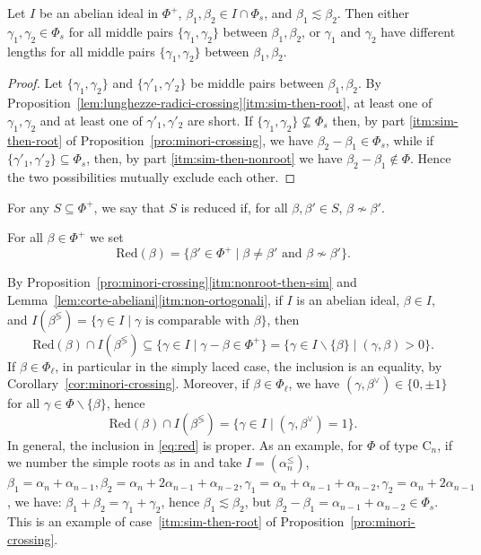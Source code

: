 \documentclass[ALCO,published]{cedram}
\theoremstyle{plain}
\newcommand\smeno{\smallsetminus}
\newcommand\al{\alpha}
\newcommand\be{\beta}
\newcommand\ga{\gamma}
\newcommand\comp{\lessgtr}
\newcommand\nosim{\not\sim}
\newcommand\red{\mathrm{Red}}
\renewcommand{\leq}{\leqslant}
\begin{document}
\begin{cor}\label{cor:minori-crossing-2}
Let $I$ be an abelian ideal in $\Phi^+$, $\be_1, \be_2\in I\cap \Phi_s$, and $\be_1\lesssim \be_2$.
Then either $\ga_1, \ga_2\in \Phi_s$ for all middle pairs  $\{\ga_1, \ga_2\}$ between $\be_1, \be_2$, 
or $\ga_1$ and $\ga_2$ have different lengths for all middle pairs  $\{\ga_1, \ga_2\}$ between $\be_1, \be_2$.
\end{cor}

\begin{proof}
Let $\{\ga_1, \ga_2\}$ and $\{\ga'_1, \ga'_2\}$ be middle pairs between $\be_1, \be_2$. 
By Proposition~\ref{lem:lunghezze-radici-crossing}\ref{itm:sim-then-root}, at least one of $\ga_1, \ga_2$ and at least one of $\ga'_1, \ga'_2$ are short.
If $\{\ga_1, \ga_2\}\not\subseteq \Phi_s$ then, by part \ref{itm:sim-then-root} of Proposition~\ref{pro:minori-crossing}, we have $\be_2-\be_1\in \Phi_s$, while if $\{\ga'_1, \ga'_2\}\subseteq \Phi_s$, then, by part \ref{itm:sim-then-nonroot} we have $\be_2-\be_1\not\in \Phi$.
Hence the two possibilities mutually exclude each other.
\end{proof}

\begin{defi}\label{def:red}
For any  $S\subseteq\Phi^+$,  
we say that $S$ is reduced if, for all $\be, \be'\in S$, $\be\nosim \be'$. 
\par
For all $\be\in \Phi^+$ we set 
$$
\red(\be)=\{\be'\in \Phi^+\mid \be\neq \be' \text{ and } \be\not\sim \be'\}.
$$
\end{defi}

\begin{rem}\label{rem:red}
By Proposition~\ref{pro:minori-crossing}\ref{itm:nonroot-then-sim} and Lemma~\ref{lem:corte-abeliani}\ref{itm:non-ortogonali}, if $I$ is an abelian ideal, $\be\in I$, and $I( \be^{\comp})=\{\ga\in I\mid \ga\text{ is comparable with }\be\}$, then 
\begin{equation}\label{eq:red}
\red(\be)\cap I( \be^{\comp})\subseteq \{\ga\in I \mid \ga-\be\in \Phi^+\}= \{\ga\in I\smeno\{\be\}\mid (\ga,\be)> 0\}.
\end{equation}
If $\be\in \Phi_\ell$, in particular in the simply laced case, the inclusion is an equality, by Corollary~\ref{cor:minori-crossing}. 
Moreover, if $\be\in \Phi_\ell$, we have $(\ga, \be^\vee)\in \{0, \pm 1\}$ for all $\ga\in \Phi\smeno\{\be\}$, hence 
\begin{equation}\label{eq:red-2}
\red(\be)\cap I( \be^{\comp}) =\{\ga\in I \mid (\ga,\be^\vee) = 1\}.
\end{equation}
In general, the inclusion in \eqref{eq:red} is proper. 
As an example, for $\Phi$ of type $\mathrm C_n$, if we number the simple roots as in \cite{Bou} and take $I=(\al_n^\leq)$,  $\be_1=\al_n+\al_{n-1}, \be_2=\al_n+2\al_{n-1}+\al_{n-2}, \ga_1=\al_n+\al_{n-1}+\al_{n-2}, \ga_2=\al_n+2\al_{n-1}$, we have: $\be_1+\be_2=\ga_1+\ga_2$, hence $\be_1\lesssim \be_2$, but $\be_2-\be_1=\al_{n-1}+\al_{n-2}\in \Phi_s$.
This is an example of case~\ref{itm:sim-then-root} of Proposition~\ref{pro:minori-crossing}.
\end{rem}
\end{document}
